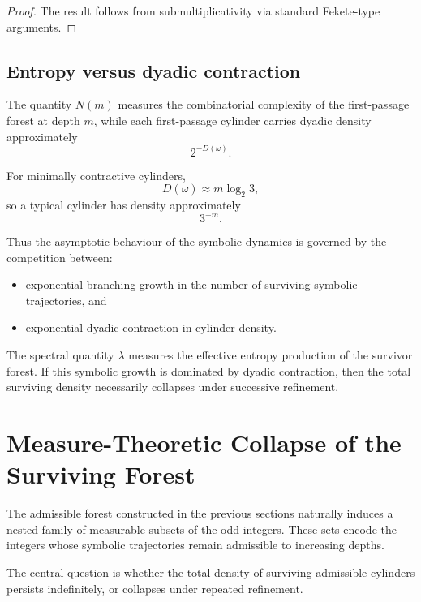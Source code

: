 \documentclass[12pt, oneside]{article}
\numberwithin{equation}{section}
\theoremstyle{definition}
\theoremstyle{plain}
\theoremstyle{remark}
\begin{document}
\begin{proof}
The result follows from submultiplicativity via standard
Fekete-type arguments.
\end{proof}

\subsection{Entropy versus dyadic contraction}

The quantity \(N(m)\) measures the combinatorial complexity of the
first-passage forest at depth \(m\), while each first-passage
cylinder carries dyadic density approximately
\[
2^{-D(\omega)}.
\]

For minimally contractive cylinders,
\[
D(\omega)\approx m\log_2 3,
\]
so a typical cylinder has density approximately
\[
3^{-m}.
\]

Thus the asymptotic behaviour of the symbolic dynamics is governed
by the competition between:
\begin{itemize}
\item exponential branching growth in the number of surviving
symbolic trajectories, and
\item exponential dyadic contraction in cylinder density.
\end{itemize}

The spectral quantity \(\lambda\) measures the effective entropy
production of the survivor forest. If this symbolic growth is
dominated by dyadic contraction, then the total surviving density
necessarily collapses under successive refinement.

\section{Measure-Theoretic Collapse of the Surviving Forest}
\label{sec:measure-collapse}

The admissible forest constructed in the previous sections naturally
induces a nested family of measurable subsets of the odd integers.
These sets encode the integers whose symbolic trajectories remain
admissible to increasing depths.

The central question is whether the total density of surviving
admissible cylinders persists indefinitely, or collapses under repeated
refinement.

\end{document}
